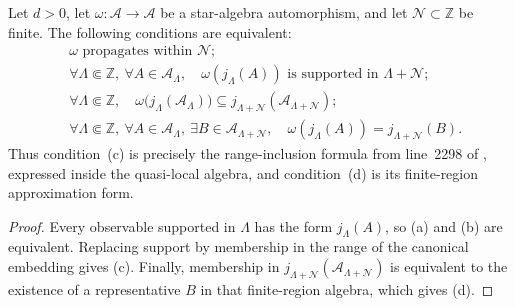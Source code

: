 \begin{lemma}
    \label{lem:qca_propagates_within_iff}
    \leanok
    Let $d>0$, let $\omega\colon\mathcal A\to\mathcal A$ be a star-algebra
    automorphism, and let $\mathcal N\subset\mathbb Z$ be finite.  The following
    conditions are equivalent:
    \begin{align}
         & \omega\text{ propagates within }\mathcal N; \tag{a}              \\
         & \forall\Lambda\Subset\mathbb Z,\ \forall A\in\mathcal A_\Lambda,
        \quad \omega(j_\Lambda(A))\text{ is supported in }
        \Lambda+\mathcal N; \tag{b}                                         \\
         & \forall\Lambda\Subset\mathbb Z,\quad
        \omega\bigl(j_\Lambda(\mathcal A_\Lambda)\bigr)
        \subseteq j_{\Lambda+\mathcal N}
        (\mathcal A_{\Lambda+\mathcal N}); \tag{c}                          \\
         & \forall\Lambda\Subset\mathbb Z,\ \forall A\in\mathcal A_\Lambda,
        \ \exists B\in\mathcal A_{\Lambda+\mathcal N},\quad
        \omega(j_\Lambda(A))=j_{\Lambda+\mathcal N}(B). \tag{d}
    \end{align}
    Thus condition~\textup{(c)} is precisely the range-inclusion formula from
    line~2298 of \cite{Cirac2017MPU}, expressed inside the quasi-local algebra,
    and condition~\textup{(d)} is its finite-region approximation form.
\end{lemma}

\begin{proof}\leanok
    Every observable supported in $\Lambda$ has the form $j_\Lambda(A)$, so
    \textup{(a)} and \textup{(b)} are equivalent.  Replacing support by
    membership in the range of the canonical embedding gives \textup{(c)}.
    Finally, membership in
    $j_{\Lambda+\mathcal N}(\mathcal A_{\Lambda+\mathcal N})$ is equivalent to
    the existence of a representative $B$ in that finite-region algebra, which
    gives \textup{(d)}.
\end{proof}


